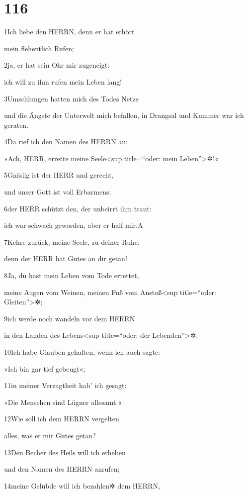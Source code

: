 \hypertarget{section-115}{%
\section{116}\label{section-115}}

1Ich liebe den HERRN, denn er hat erhört

mein flehentlich Rufen;

2ja, er hat sein Ohr mir zugeneigt:

ich will zu ihm rufen mein Leben lang!

3Umschlungen hatten mich des Todes Netze

und die Ängste der Unterwelt mich befallen, in Drangsal und Kummer war
ich geraten.

4Da rief ich den Namen des HERRN an:

»Ach, HERR, errette meine Seele\textless sup title=``oder: mein
Leben''\textgreater✲!«

5Gnädig ist der HERR und gerecht,

und unser Gott ist voll Erbarmens;

6der HERR schützt den, der unbeirrt ihm traut:

ich war schwach geworden, aber er half mir.{A}

7Kehre zurück, meine Seele, zu deiner Ruhe,

denn der HERR hat Gutes an dir getan!

8Ja, du hast mein Leben vom Tode errettet,

meine Augen vom Weinen, meinen Fuß vom Anstoß\textless sup title=``oder:
Gleiten''\textgreater✲;

9ich werde noch wandeln vor dem HERRN

in den Landen des Lebens\textless sup title=``oder: der
Lebenden''\textgreater✲.

10Ich habe Glauben gehalten, wenn ich auch sagte:

»Ich bin gar tief gebeugt«;

11in meiner Verzagtheit hab' ich gesagt:

»Die Menschen sind Lügner allesamt.«

12Wie soll ich dem HERRN vergelten

alles, was er mir Gutes getan?

13Den Becher des Heils will ich erheben

und den Namen des HERRN anrufen;

14meine Gelübde will ich bezahlen✲ dem HERRN,

